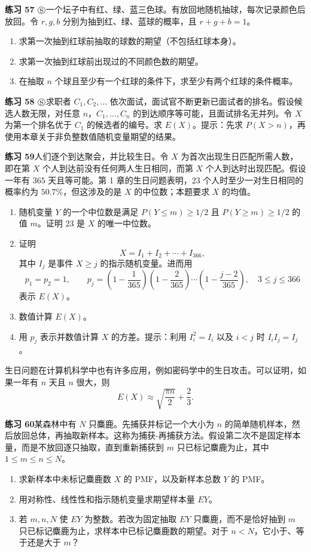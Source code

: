 \documentclass[UTF8,12pt,a4paper,fontset=fandol]{ctexart}
\begin{document}
\noindent\textbf{练习 57 $\circledS$}\quad 一个坛子中有红、绿、蓝三色球。有放回地随机抽球，每次记录颜色后放回。令 $r,g,b$ 分别为抽到红、绿、蓝球的概率，且 $r+g+b=1$。
\begin{enumerate}
  \item[(a)] 求第一次抽到红球前抽取的球数的期望（不包括红球本身）。
  \item[(b)] 求第一次抽到红球前出现过的不同颜色数的期望。
  \item[(c)] 在抽取 $n$ 个球且至少有一个红球的条件下，求至少有两个红球的条件概率。
\end{enumerate}

\noindent\textbf{练习 58 $\circledS$}\quad 求职者 $C_1,C_2,\ldots$ 依次面试，面试官不断更新已面试者的排名。假设候选人数无限，对任意 $n$，$C_1,\ldots,C_n$ 的到达顺序等可能，且面试排名无并列。令 $X$ 为第一个排名优于 $C_1$ 的候选者的编号。求 $E(X)$。提示：先求 $P(X>n)$，再使用本章关于非负整数值随机变量期望的结果。

\noindent\textbf{练习 59}\quad 人们逐个到达聚会，并比较生日。令 $X$ 为首次出现生日匹配所需人数，即在第 $X$ 个人到达前没有任何两人生日相同，而第 $X$ 个人到达时出现匹配。假设一年有 $365$ 天且等可能。第 1 章的生日问题表明，$23$ 个人时至少一对生日相同的概率约为 $50.7\%$，但这涉及的是 $X$ 的中位数；本题要求 $X$ 的均值。
\begin{enumerate}
  \item[(a)] 随机变量 $Y$ 的一个中位数是满足 $P(Y\le m)\ge 1/2$ 且 $P(Y\ge m)\ge 1/2$ 的值 $m$。证明 $23$ 是 $X$ 的唯一中位数。
  \item[(b)] 证明
  \[
    X=I_1+I_2+\cdots+I_{366},
  \]
  其中 $I_j$ 是事件 $X\ge j$ 的指示随机变量。进而用
  \[
    p_1=p_2=1,\qquad
    p_j=\left(1-\frac{1}{365}\right)\left(1-\frac{2}{365}\right)\cdots
    \left(1-\frac{j-2}{365}\right),\quad 3\le j\le 366
  \]
  表示 $E(X)$。
  \item[(c)] 数值计算 $E(X)$。
  \item[(d)] 用 $p_j$ 表示并数值计算 $X$ 的方差。提示：利用 $I_i^2=I_i$ 以及 $i<j$ 时 $I_iI_j=I_j$。
\end{enumerate}
生日问题在计算机科学中也有许多应用，例如密码学中的生日攻击。可以证明，如果一年有 $n$ 天且 $n$ 很大，则
\[
  E(X)\approx \sqrt{\frac{\pi n}{2}}+\frac{2}{3}.
\]

\noindent\textbf{练习 60}\quad 某森林中有 $N$ 只麋鹿。先捕获并标记一个大小为 $n$ 的简单随机样本，然后放回总体，再抽取新样本。这称为捕获-再捕获方法。假设第二次不是固定样本量，而是不放回逐只抽取，直到重新捕获到 $m$ 只已标记麋鹿为止，其中 $1\le m\le n\le N$。
\begin{enumerate}
  \item[(a)] 求新样本中未标记麋鹿数 $X$ 的 PMF，以及新样本总数 $Y$ 的 PMF。
  \item[(b)] 用对称性、线性性和指示随机变量求期望样本量 $EY$。
  \item[(c)] 若 $m,n,N$ 使 $EY$ 为整数。若改为固定抽取 $EY$ 只麋鹿，而不是恰好抽到 $m$ 只已标记麋鹿为止，求样本中已标记麋鹿数的期望。对于 $n<N$，它小于、等于还是大于 $m$？
\end{enumerate}
\end{document}
